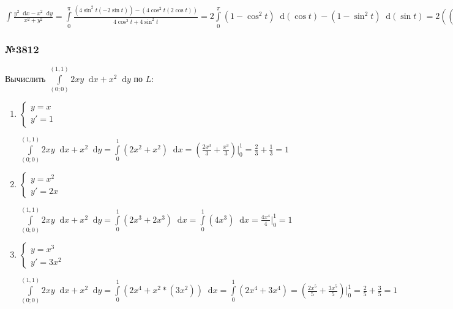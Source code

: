 \documentclass{article}
\newcommand*\diff{\mathop{}\!\mathrm{d}}
\begin{document}
$\int \frac{y^2 \diff x - x^2 \diff y}{x^2 + y^2} = \int\limits_{0}^{\pi} \frac{(4 \sin^2 t (-2 \sin t)) - (4 \cos^2 t (2 \cos t))}{4 \cos^2 t + 4 \sin^2 t} = 2 \int\limits_{0}^{\pi} (1 - \cos^2 t) \diff (\cos t) - (1 - \sin^2 t) \diff (\sin t) = 2 ((\cos t - \frac{\cos^3 t}{3}) - (\sin t - \frac{\sin^3 t}{3})) \bigg|_{0}^{\pi} = 2 (-1 + \frac{1}{3} - 0 + 0 - (1 - \frac{1}{3} - 0 + 0)) = 2 (-\frac{2}{3} - \frac{2}{3}) = 2(-\frac{4}{3}) = -\frac{8}{3}$

\subsubsection{№3812}

Вычислить $\int\limits_{(0; 0)}^{(1,1)} 2xy \diff x + x^2 \diff y$ по $L$:

\begin{enumerate}
    \item 

    $\begin{cases}
        y = x \\
        y' = 1
    \end{cases}$

    $\int\limits_{(0; 0)}^{(1,1)} 2xy \diff x + x^2 \diff y = \int\limits_{0}^{1} (2x^2 + x^2) \diff x = (\frac{2x^3}{3} + \frac{x^3}{3}) \bigg|_{0}^{1} = \frac{2}{3} + \frac{1}{3} = 1$
    
    \item 

    $\begin{cases}
        y = x^2 \\
        y' = 2x
    \end{cases}$

    $\int\limits_{(0; 0)}^{(1,1)} 2xy \diff x + x^2 \diff y = \int\limits_{0}^{1} (2x^3 + 2x^3) \diff x = \int\limits_{0}^{1} (4x^3) \diff x = \frac{4x^4}{4} \bigg|_{0}^{1} = 1$

    \item

    $\begin{cases}
        y = x^3 \\
        y' = 3x^2
    \end{cases}$

    $\int\limits_{(0; 0)}^{(1,1)} 2xy \diff x + x^2 \diff y = \int\limits_{0}^{1} (2x^4 + x^2 * (3x^2)) \diff x = \int\limits_{0}^{1} (2x^4 + 3x^{4}) = (\frac{2x^5}{5} + \frac{3x^5}{5}) \bigg|_{0}^{1} = \frac{2}{5} + \frac{3}{5} = 1$
\end{enumerate}
\end{document}
